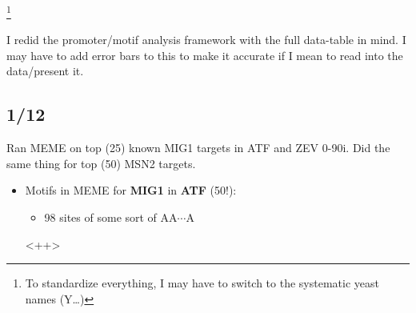 \documentclass[12pt]{article}\usepackage[]{graphicx}\usepackage[]{color}
\begin{document}
\footnote{To standardize everything, I may have to switch to the systematic yeast names (Y\ldots)}

I redid the promoter/motif analysis framework with the full data-table in mind. I may have to add error bars to this to make it accurate if I mean to read into the data/present it.

\subsection{1/12}
Ran MEME on top (25) known MIG1 targets in ATF and ZEV 0-90i. Did the same thing for top (50) MSN2 targets.

\begin{itemize}
    \item Motifs in MEME for \textbf{MIG1} in \textbf{ATF} (50!):
        \begin{itemize}
            \item 98 sites of some sort of AA$\cdots$A
        \end{itemize}<++>

\end{itemize}
\end{document}
